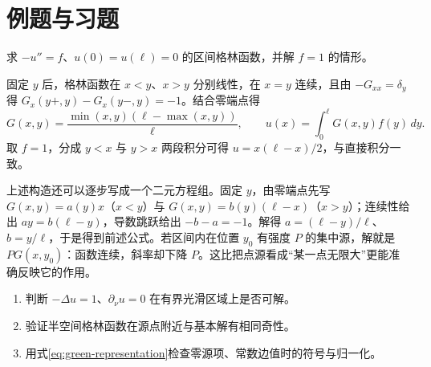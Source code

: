 \section{例题与习题}
\begin{example}
求 $-u''=f$、$u(0)=u(\ell)=0$ 的区间格林函数，并解 $f=1$ 的情形。
\end{example}
\begin{solve}
固定 $y$ 后，格林函数在 $x<y$、$x>y$ 分别线性，在 $x=y$ 连续，且由 $-G_{xx}=\delta_y$ 得 $G_x(y+,y)-G_x(y-,y)=-1$。结合零端点得
\[
 G(x,y)=\frac{\min(x,y)(\ell-\max(x,y))}{\ell},\qquad
 u(x)=\int_0^\ell G(x,y)f(y)\,dy.
\]
取 $f=1$，分成 $y<x$ 与 $y>x$ 两段积分可得 $u=x(\ell-x)/2$，与直接积分一致。
\end{solve}

上述构造还可以逐步写成一个二元方程组。固定 $y$，由零端点先写 $G(x,y)=a(y)x$（$x<y$）与 $G(x,y)=b(y)(\ell-x)$（$x>y$）；连续性给出 $ay=b(\ell-y)$，导数跳跃给出 $-b-a=-1$。解得 $a=(\ell-y)/\ell$、$b=y/\ell$，于是得到前述公式。若区间内在位置 $y_0$ 有强度 $P$ 的集中源，解就是 $P G(x,y_0)$：函数连续，斜率却下降 $P$。这比把点源看成“某一点无限大”更能准确反映它的作用。
\begin{enumerate}
 \item 判断 $-\Delta u=1$、$\partial_\nu u=0$ 在有界光滑区域上是否可解。
 \item 验证半空间格林函数在源点附近与基本解有相同奇性。
 \item 用式\eqref{eq:green-representation}检查零源项、常数边值时的符号与归一化。
\end{enumerate}

